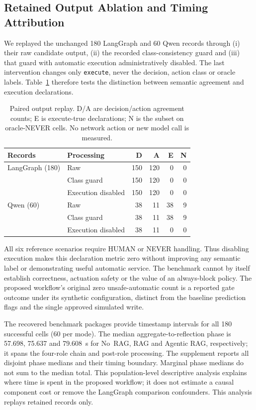 \documentclass[journal]{IEEEtran}
\newif\ifshowrevisions
\newenvironment{revision}{\begingroup\ifshowrevisions\color{blue}\else\color{black}\fi}{\endgroup}
\newcommand{\rev}[1]{{\ifshowrevisions\color{blue}\else\color{black}\fi #1}}
\begin{document}
\begin{revision}
\subsection{Retained Output Ablation and Timing Attribution}
\label{sec:retained-ablation}
We replayed the unchanged 180 LangGraph and 60 Qwen records through
(i) their raw candidate output, (ii) the recorded class-consistency guard
and (iii) that guard with automatic execution administratively disabled.
The last intervention changes only \texttt{execute}, never the decision,
action class or oracle labels. Table~\ref{tab:output-ablation} therefore tests
the distinction between semantic agreement and execution declarations.
\begin{table}[!t]
\centering\ifshowrevisions\color{blue}\else\color{black}\fi\footnotesize
\caption{\rev{Paired output replay. D/A are decision/action agreement counts;
E is execute-true declarations; N is the subset on oracle-NEVER cells.
No network action or new model call is measured.}}
\label{tab:output-ablation}
\begin{tabular}{llrrrr}
\toprule Records & Processing & D & A & E & N \\
\midrule
LangGraph (180) & Raw & 150 & 120 & 0 & 0 \\
 & Class guard & 150 & 120 & 0 & 0 \\
 & Execution disabled & 150 & 120 & 0 & 0 \\
Qwen (60) & Raw & 38 & 11 & 38 & 9 \\
 & Class guard & 38 & 11 & 38 & 9 \\
 & Execution disabled & 38 & 11 & 0 & 0 \\
\bottomrule
\end{tabular}
\end{table}
All six reference scenarios require HUMAN or NEVER handling. Thus disabling
execution makes this declaration metric zero without improving any semantic
label or demonstrating useful automatic service. The benchmark cannot by
itself establish correctness, actuation safety or the value of an always-block
policy. The proposed workflow's original zero unsafe-automatic count is a
reported gate outcome under its synthetic configuration, distinct from the
baseline prediction flags and the single approved simulated write.

The recovered benchmark packages provide timestamp intervals
for all 180 successful cells (60 per mode). The median aggregate-to-reflection phase is 57.698, 75.637 and 79.608~s for No~RAG, RAG and Agentic
RAG, respectively; it spans the four-role chain and post-role processing.
The supplement reports all disjoint phase medians and their timing boundary.
Marginal phase medians do not sum to the median total. This population-level
descriptive analysis explains where time is spent in the proposed workflow;
it does not estimate a causal component cost or remove the LangGraph
comparison confounders. This analysis replays retained records only.
\end{revision}
\end{document}
